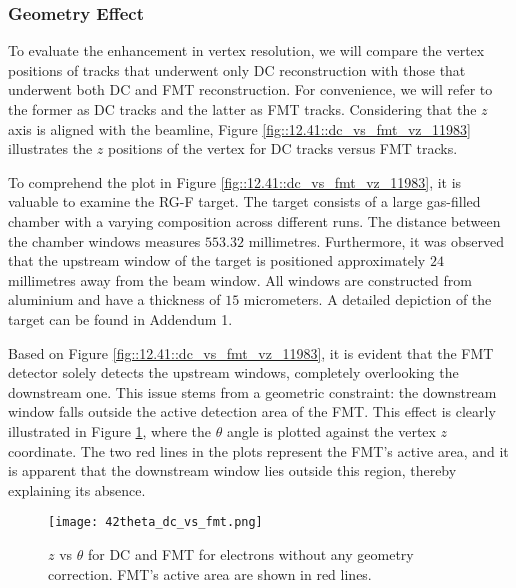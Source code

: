\subsubsection{Geometry Effect}
\label{12.42::geometry_effect}
    To evaluate the enhancement in vertex resolution, we will compare the vertex positions of tracks that underwent only DC reconstruction with those that underwent both DC and FMT reconstruction.
    For convenience, we will refer to the former as DC tracks and the latter as FMT tracks.
    Considering that the $z$ axis is aligned with the beamline, Figure \ref{fig::12.41::dc_vs_fmt_vz_11983} illustrates the $z$ positions of the vertex for DC tracks versus FMT tracks.

    To comprehend the plot in Figure \ref{fig::12.41::dc_vs_fmt_vz_11983}, it is valuable to examine the RG-F target.
    The target consists of a large gas-filled chamber with a varying composition across different runs.
    The distance between the chamber windows measures $553.32$ millimetres.
    Furthermore, it was observed that the upstream window of the target is positioned approximately $24$ millimetres away from the beam window.
    All windows are constructed from aluminium and have a thickness of $15$ micrometers.
    A detailed depiction of the target can be found in Addendum 1.

    Based on Figure \ref{fig::12.41::dc_vs_fmt_vz_11983}, it is evident that the FMT detector solely detects the upstream windows, completely overlooking the downstream one.
    This issue stems from a geometric constraint: the downstream window falls outside the active detection area of the FMT.
    This effect is clearly illustrated in Figure \ref{eq::12.42::vz_vs_theta}, where the $\theta$ angle is plotted against the vertex $z$ coordinate.
    The two red lines in the plots represent the FMT's active area, and it is apparent that the downstream window lies outside this region, thereby explaining its absence.

    \begin{figure}[t!]
        \texttt{[image: 42theta\_dc\_vs\_fmt.png]}
        \caption[$z$ vs $\theta$ for DC and FMT.]
        {$z$ vs $\theta$ for DC and FMT for electrons without any geometry correction.
        FMT's active area are shown in red lines.}
        \label{eq::12.42::vz_vs_theta}
    \end{figure}

